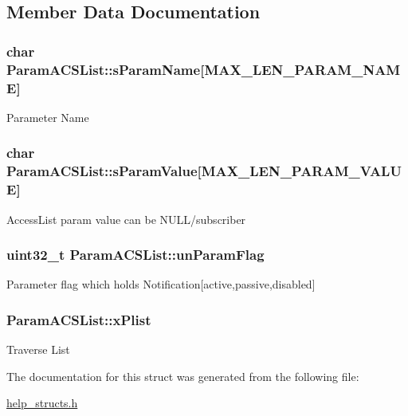 \subsection{Member Data Documentation}
\hypertarget{structParamACSList_a6f10f6d98eee67fbe3467a96d1b4568b}{
\subsubsection[{s\-Param\-Name}]{\setlength{\rightskip}{0pt plus 5cm}char Param\-A\-C\-S\-List\-::s\-Param\-Name\mbox{[}{\bf M\-A\-X\-\_\-\-L\-E\-N\-\_\-\-P\-A\-R\-A\-M\-\_\-\-N\-A\-M\-E}\mbox{]}}}\label{structParamACSList_a6f10f6d98eee67fbe3467a96d1b4568b}
Parameter Name \hypertarget{structParamACSList_a6360e9d86e6060e2c030288ca13f7975}{
\subsubsection[{s\-Param\-Value}]{\setlength{\rightskip}{0pt plus 5cm}char Param\-A\-C\-S\-List\-::s\-Param\-Value\mbox{[}{\bf M\-A\-X\-\_\-\-L\-E\-N\-\_\-\-P\-A\-R\-A\-M\-\_\-\-V\-A\-L\-U\-E}\mbox{]}}}\label{structParamACSList_a6360e9d86e6060e2c030288ca13f7975}
Access\-List param value can be N\-U\-L\-L/subscriber \hypertarget{structParamACSList_a91e0b1df78a7d043503337e3c149c7fa}{
\subsubsection[{un\-Param\-Flag}]{\setlength{\rightskip}{0pt plus 5cm}uint32\-\_\-t Param\-A\-C\-S\-List\-::un\-Param\-Flag}}\label{structParamACSList_a91e0b1df78a7d043503337e3c149c7fa}
Parameter flag which holds Notification\mbox{[}active,passive,disabled\mbox{]} \hypertarget{structParamACSList_a519fcf46a0947e661e022ebfbb4af1e8}{
\subsubsection[{x\-Plist}]{ Param\-A\-C\-S\-List\-::x\-Plist}}\label{structParamACSList_a519fcf46a0947e661e022ebfbb4af1e8}
Traverse List 

The documentation for this struct was generated from the following file\-:\begin{DoxyCompactItemize}
\item 
\hyperlink{help__structs_8h}{help\-\_\-structs.\-h}\end{DoxyCompactItemize}
